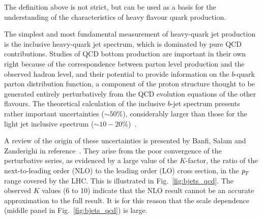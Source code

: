 The definition above is not strict, but can be used as a basis for the understanding of the characteristics of heavy flavour quark production.



The simplest and most fundamental measurement of heavy-quark jet production is
the inclusive heavy-quark jet spectrum, which is dominated by pure QCD contributions. 
Studies of QCD bottom production are important in their own right because of the correspondence between parton level production and the observed hadron level, and their potential to provide information on the $b$-quark parton distribution function, a component of the proton structure thought to be generated entirely perturbatively from the QCD evolution equations of the other flavours. The theoretical calculation of the inclusive $b$-jet spectrum presents rather important uncertainties ($\sim 50\%$), considerably larger than those for the light jet inclusive spectrum ($\sim 10-20\%$)~\cite{Frixione:1996nh}. 

A review of the origin of these uncertainties is presented by Banfi, Salam and Zanderighi in reference~\cite{Salam.AccurateHQ}.  They arise from the poor convergence of the perturbative series, as evidenced by a large value of the $K$-factor, the ratio of the next-to-leading order (NLO) to the leading order (LO) cross section, in the ${\emph{p}_{T}}$ range covered by the LHC.  This is illustrated in Fig.~\ref{fig:bjets_qcd}.  The observed $K$ values (6 to 10) indicate that the NLO result cannot be an accurate approximation to the full result. It is for this reason that the scale dependence (middle panel in Fig.~\ref{fig:bjets_qcd}) is large. 


